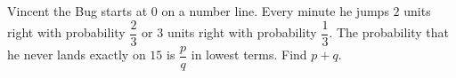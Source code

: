 Vincent the Bug starts at $0$ on a number line. Every minute he jumps $2$ units right with probability $\dfrac23$ or $3$ units right with probability $\dfrac13$. The probability that he never lands exactly on $15$ is $\dfrac pq$ in lowest terms. Find $p+q$.
